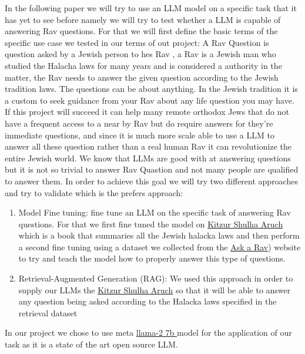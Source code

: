 \documentclass[11pt]{article}
\begin{document}
In the following paper we will try to use an LLM model on a specific task that it has yet to see before namely we will try to test whether a LLM is capable of answering Rav questions. For that we will first define the basic terms of the specific use case we tested in our terms of out project:
A Rav Question is question asked by a Jewish person to hes Rav , a Rav is a Jewish man who studied the Halacha laws for many years and is considered a authority in the matter, the Rav needs to answer the given question according to the Jewish tradition laws. The questions can be about anything. In the Jewish tradition it is a custom to seek guidance from your Rav about any life question you may have. If this project will succeed it can help many remote orthodox Jews  that do not have a frequent access to a near by Rav but do require answers for they're immediate questions, and since it is much more scale able to use a LLM to answer all these question rather than a real human Rav it can revolutionize the entire Jewish world.  
We know that LLMs are good with at answering questions but it is not so trivial to answer Rav Quastion and not many people are qualified to answer them.
In order to achieve this goal we will try two different approaches and try to validate which is the prefers approach:
\begin{enumerate}
    \item Model Fine tuning: fine tune an LLM on the specific task of answering Rav questions. For that we first fine tuned the model on  \href{https://www.sefaria.org.il/Kitzur_Shulchan_Arukh.1.7?lang=en}{ Kitzur Shulha Aruch} which is a book that summaries all the Jewish halacka laws and then perform a second fine tuning using a dataset we collected from the \href{https://asktherav.com/ }{Ask a Rav}) website to try and teach the model how to properly answer this type of questions.
    \item Retrieval-Augmented Generation (RAG): We used this approach in order to supply our LLMs the  \href{https://www.sefaria.org.il/Kitzur_Shulchan_Arukh.1.7?lang=en}{ Kitzur Shulha Aruch} so that it will be able to answer any question being asked according to the Halacka laws specified in the retrieval dataset
\end{enumerate}
In our project we chose to use meta \href{https://llama.meta.com/llama2/}{ llama-2 7b } model for the application of our task as it is a state of the art open source LLM.
\end{document}
